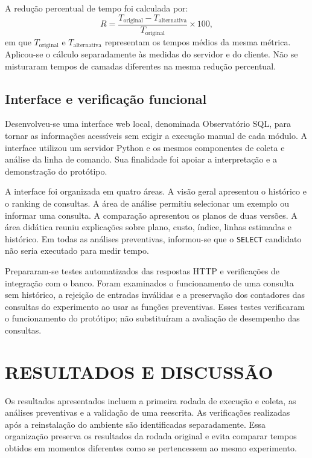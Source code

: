 \documentclass{UNESC}
\begin{document}
A redução percentual de tempo foi calculada por:
\begin{equation}
R = \frac{T_{\mathrm{original}}-T_{\mathrm{alternativa}}}{T_{\mathrm{original}}}\times 100,
\label{eq:reducao}
\end{equation}
em que $T_{\mathrm{original}}$ e $T_{\mathrm{alternativa}}$ representam os tempos médios da mesma métrica. Aplicou-se o cálculo separadamente às medidas do servidor e do cliente. Não se misturaram tempos de camadas diferentes na mesma redução percentual.

\subsection{Interface e verificação funcional}

Desenvolveu-se uma interface web local, denominada Observatório SQL, para tornar as informações acessíveis sem exigir a execução manual de cada módulo. A interface utilizou um servidor Python e os mesmos componentes de coleta e análise da linha de comando. Sua finalidade foi apoiar a interpretação e a demonstração do protótipo.

A interface foi organizada em quatro áreas. A visão geral apresentou o histórico e o ranking de consultas. A área de análise permitiu selecionar um exemplo ou informar uma consulta. A comparação apresentou os planos de duas versões. A área didática reuniu explicações sobre plano, custo, índice, linhas estimadas e histórico. Em todas as análises preventivas, informou-se que o \texttt{SELECT} candidato não seria executado para medir tempo.

Prepararam-se testes automatizados das respostas HTTP e verificações de integração com o banco. Foram examinados o funcionamento de uma consulta sem histórico, a rejeição de entradas inválidas e a preservação dos contadores das consultas do experimento ao usar as funções preventivas. Esses testes verificaram o funcionamento do protótipo; não substituíram a avaliação de desempenho das consultas.


\section{RESULTADOS E DISCUSSÃO}

Os resultados apresentados incluem a primeira rodada de execução e coleta, as análises preventivas e a validação de uma reescrita. As verificações realizadas após a reinstalação do ambiente são identificadas separadamente. Essa organização preserva os resultados da rodada original e evita comparar tempos obtidos em momentos diferentes como se pertencessem ao mesmo experimento.
\end{document}
